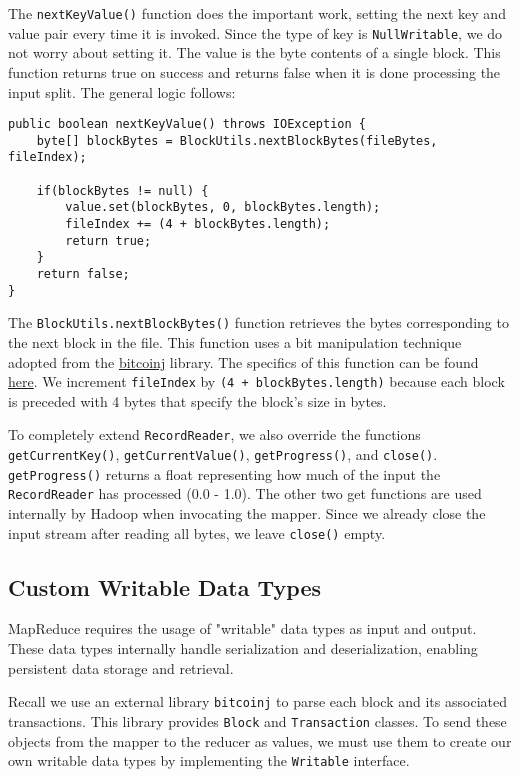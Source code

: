 \documentclass[9pt,twocolumn,twoside]{idsi}
\begin{document}
The \lstinline{nextKeyValue()} function does the important work, setting the next key and value pair every time it is invoked. Since the type of key is \lstinline{NullWritable}, we do not worry about setting it. The value is the byte contents of a single block. This function returns true on success and returns false when it is done processing the input split. The general logic follows:

\begin{lstlisting}
public boolean nextKeyValue() throws IOException {
    byte[] blockBytes = BlockUtils.nextBlockBytes(fileBytes, fileIndex);

    if(blockBytes != null) {
        value.set(blockBytes, 0, blockBytes.length);
        fileIndex += (4 + blockBytes.length);
        return true;
    }
    return false;
}
\end{lstlisting}

The \lstinline{BlockUtils.nextBlockBytes()} function retrieves the bytes corresponding to the next block in the file. This function uses a bit manipulation technique adopted from the \href{https://bitcoinj.github.io/}{bitcoinj} library. The specifics of this function can be found \href{https://google.com}{here}. We increment \lstinline{fileIndex} by \lstinline{(4 + blockBytes.length)} because each block is preceded with 4 bytes that specify the block's size in bytes.

To completely extend \lstinline{RecordReader}, we also override the functions \lstinline{getCurrentKey()}, \lstinline{getCurrentValue()}, \lstinline{getProgress()}, and \lstinline{close()}. \lstinline{getProgress()} returns a float representing how much of the input the \lstinline{RecordReader} has processed (0.0 - 1.0). The other two get functions are used internally by Hadoop when invocating the mapper. Since we already close the input stream after reading all bytes, we leave \lstinline{close()} empty.

\subsection{Custom Writable Data Types}

MapReduce requires the usage of "writable" data types as input and output. These data types internally handle serialization and deserialization, enabling persistent data storage and retrieval.

Recall we use an external library \lstinline{bitcoinj} to parse each block and its associated transactions. This library provides \lstinline{Block} and \lstinline{Transaction} classes. To send these objects from the mapper to the reducer as values, we must use them to create our own writable data types by implementing the \lstinline{Writable} interface.
\end{document}
